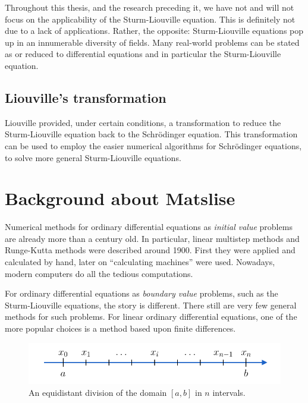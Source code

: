 Throughout this thesis, and the research preceding it, we have not and will not focus on the applicability of the Sturm-Liouville equation. This is definitely not due to a lack of applications. Rather, the opposite: Sturm-Liouville equations pop up in an innumerable diversity of fields. Many real-world problems can be stated as or reduced to differential equations and in particular the Sturm-Liouville equation.


\subsection{Liouville's transformation}\label{sec:c2_liouville_transformation}

Liouville provided, under certain conditions, a transformation to reduce the Sturm-Liouville equation back to the Schrödinger equation. This transformation can be used to employ the easier numerical algorithms for Schrödinger equations, to solve more general Sturm-Liouville equations.

\section{Background about Matslise}

Numerical methods for ordinary differential equations as \emph{initial value} problems are already more than a century old. In particular, linear multistep methods and Runge-Kutta methods were described around 1900. First they were applied and calculated by hand, later on ``calculating machines'' \cite{milne_numerical_1926} were used. Nowadays, modern computers do all the tedious computations.

For ordinary differential equations as \emph{boundary value} problems, such as the Sturm-Liouville equations, the story is different. There still are very few general methods for such problems. For linear ordinary differential equations, one of the more popular choices is a method based upon finite differences.

\begin{figure}
    \begin{center}
        \includegraphics[width=\textwidth]{img/chapter2/finite_difference_grid.pdf}
    \end{center}
    \caption{An equidistant division of the domain $[a, b]$ in $n$ intervals.}
    \label{fig:c2_finite_difference_grid}
\end{figure}

